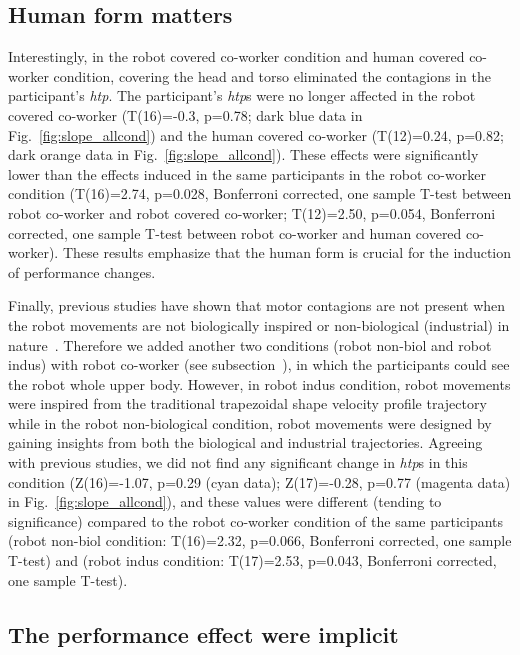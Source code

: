 \subsection{Human form matters}

Interestingly, in the robot covered co-worker condition and human covered co-worker condition, covering the head and torso eliminated the contagions in the participant's \textit{htp}. The participant's {\it htp}s were no longer affected in the robot covered co-worker (T(16)=-0.3, p=0.78; dark blue data in Fig.~\ref{fig:slope_allcond}) and the human covered co-worker (T(12)=0.24, p=0.82; dark orange data in Fig.~\ref{fig:slope_allcond}). These effects were significantly lower than the effects induced in the same participants in the robot co-worker condition (T(16)=2.74, p=0.028, Bonferroni corrected, one sample T-test between robot co-worker and robot covered co-worker; T(12)=2.50, p=0.054, Bonferroni corrected, one sample T-test between robot co-worker and human covered co-worker). These results emphasize that the human form is crucial for the induction of performance changes.

Finally, previous studies have shown that motor contagions are not present when the robot movements are not biologically inspired or non-biological (industrial) in nature~\cite{Kilner:CurBio:2003,Bisio:PlosOne:2014}. Therefore we added another two conditions (robot non-biol and robot indus) with robot co-worker (see subsection~), in which the participants could see the robot whole upper body. However, in robot indus condition, robot movements were inspired from the traditional trapezoidal shape velocity profile trajectory while in the robot non-biological condition, robot movements were designed by gaining insights from both the biological and industrial trajectories. Agreeing with previous studies, we did not find any significant change in {\it htp}s in this condition (Z(16)=-1.07, p=0.29 (cyan data); Z(17)=-0.28, p=0.77 (magenta data) in Fig.~\ref{fig:slope_allcond}), and these values were different (tending to significance) compared to the robot co-worker condition of the same participants (robot non-biol condition: T(16)=2.32, p=0.066, Bonferroni corrected, one sample T-test) and (robot indus condition: T(17)=2.53, p=0.043, Bonferroni corrected, one sample T-test).


\subsection{The performance effect were implicit} \label{questionnaire}

